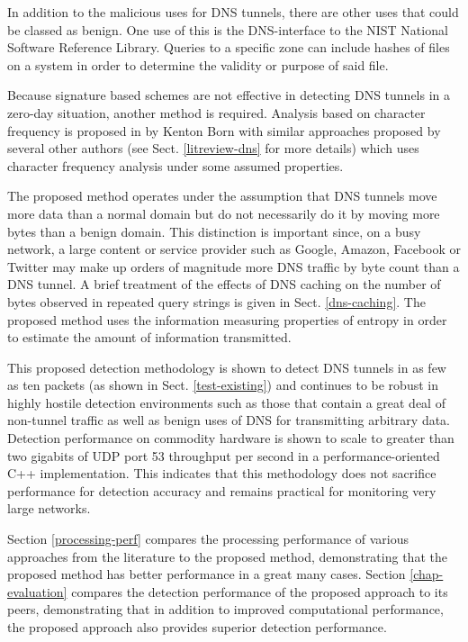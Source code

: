 \documentclass{llncs}
\begin{document}
In addition to the malicious uses for DNS tunnels, there are other uses that
could be classed as benign. One use of this is the DNS-interface to the NIST
National Software Reference Library\cite{sans-dnshash}. Queries to a specific
zone can include hashes of files on a system in order to determine the validity
or purpose of said file. 

Because signature based schemes are not effective in detecting DNS tunnels in a
zero-day situation, another method is required. Analysis based on character
frequency is proposed in\cite{Born2010.cfa} by Kenton Born with similar
approaches proposed by several other authors (see Sect. \ref{litreview-dns}
for more details) which uses character frequency analysis under some assumed
properties.

The proposed method operates under the assumption that DNS tunnels move more
data than a normal domain but do not necessarily do it by moving more bytes than
a benign domain. This distinction is important since, on a busy network, a large
content or service provider such as Google, Amazon, Facebook or Twitter may make
up orders of magnitude more DNS traffic by byte count than a DNS tunnel. A brief
treatment of the effects of DNS caching on the number of bytes observed in
repeated query strings is given in Sect. \ref{dns-caching}. The proposed method uses the information
measuring properties of entropy in order to estimate the amount of information
transmitted.

This proposed detection methodology is shown to detect DNS tunnels in as few as
ten packets (as shown in Sect. \ref{test-existing}) and continues to be robust
in highly hostile detection environments such as those that contain a great deal
of non-tunnel traffic as well as benign uses of DNS for transmitting arbitrary
data. Detection performance on commodity hardware is shown to scale to greater
than two gigabits of UDP port 53 throughput per second in a performance-oriented
C++ implementation. This indicates
that this methodology does not sacrifice performance for detection accuracy and
remains practical for monitoring very large networks.

Section \ref{processing-perf} compares the processing performance of various
approaches from the literature to the proposed method, demonstrating that the
proposed method has better performance in a great many cases. Section
\ref{chap-evaluation} compares the detection performance of the proposed
approach to its peers, demonstrating that in addition to improved computational
performance, the proposed approach also provides superior detection performance.
\end{document}
